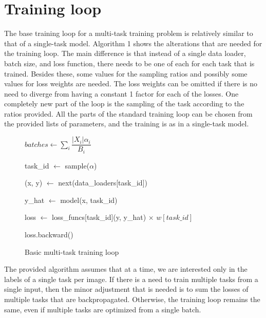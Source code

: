 \section{Training loop}
The base training loop for a multi-task training problem is relatively similar to that of a single-task model.
Algorithm 1 shows the alterations that are needed for the training loop.
The main difference is that instead of a single data loader, batch size, and loss function, there needs to be one of each for each task that is trained.
Besides these, some values for the sampling ratios and possibly some values for loss weights are needed.
The loss weights can be omitted if there is no need to diverge from having a constant 1 factor for each of the losses.
One completely new part of the loop is the sampling of the task according to the ratios provided.
All the parts of the standard training loop can be chosen from the provided lists of parameters, and the training is as in a single-task model.

\begin{figure}[ht]
    \centering
    \begin{minipage}{.95\linewidth}
        \begin{algorithm}[H]
            \caption{Basic multi-task training loop}
            $batches \leftarrow \sum_i{ \dfrac{|X_i| \alpha_i}{B_i}}$

             {
                {

                    {task\_id $\leftarrow$ sample($\alpha$)}

                        {(x, y) $\leftarrow$ next(data\_loaders[task\_id])}

                        {y\_hat $\leftarrow$ {model(x, task\_id)}}

                        {loss $\leftarrow$ loss\_funcs[task\_id](y, y\_hat) $\times$ $w[task\_id]$}

                        {loss.backward()}
                }
            }
        \end{algorithm}
    \end{minipage}
\end{figure}

The provided algorithm assumes that at a time, we are interested only in the labels of a single task per image.
If there is a need to train multiple tasks from a single input, then the minor adjustment that is needed is to sum the losses of multiple tasks that are backpropagated.
Otherwise, the training loop remains the same, even if multiple tasks are optimized from a single batch.

